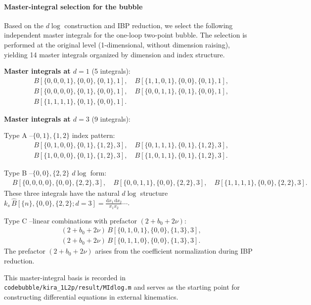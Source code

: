 \documentclass[a4paper,12pt]{article}
\def\di{{\mathrm{d}}}
\begin{document}
\paragraph{Master-integral selection for the bubble}
Based on the $d\log$ construction and IBP reduction, we select the following independent master integrals for the one-loop two-point bubble. The selection is performed at the original level (1-dimensional, without dimension raising), yielding 14 master integrals organized by dimension and index structure.

\textbf{Master integrals at $d=1$} (5 integrals):
\begin{align}
	& B[\{0, 0, 0, 1\}, \{0, 0\}, \{0, 1\}, 1], \quad
	B[\{1, 1, 0, 1\}, \{0, 0\}, \{0, 1\}, 1], \nonumber\\
	& B[\{0, 0, 0, 0\}, \{0, 1\}, \{0, 0\}, 1], \quad
	B[\{0, 0, 1, 1\}, \{0, 1\}, \{0, 0\}, 1], \nonumber\\
	& B[\{1, 1, 1, 1\}, \{0, 1\}, \{0, 0\}, 1].
\end{align}

\textbf{Master integrals at $d=3$} (9 integrals):

Type A --$\{0,1\}, \{1,2\}$ index pattern:
\begin{align}
	& B[\{0, 1, 0, 0\}, \{0, 1\}, \{1, 2\}, 3], \quad
	B[\{0, 1, 1, 1\}, \{0, 1\}, \{1, 2\}, 3], \nonumber\\
	& B[\{1, 0, 0, 0\}, \{0, 1\}, \{1, 2\}, 3], \quad
	B[\{1, 0, 1, 1\}, \{0, 1\}, \{1, 2\}, 3].
\end{align}

Type B --$\{0,0\}, \{2,2\}$ $d\log$ form:
\begin{align}
	& B[\{0, 0, 0, 0\}, \{0, 0\}, \{2, 2\}, 3], \quad
	B[\{0, 0, 1, 1\}, \{0, 0\}, \{2, 2\}, 3], \quad
	B[\{1, 1, 1, 1\}, \{0, 0\}, \{2, 2\}, 3].
\end{align}
These three integrals have the natural $d\log$ structure $k_s\,\hat{B}[\{n\},\{0,0\},\{2,2\};d=3] = \frac{\di x_1\,\di x_2}{x_1 x_2} \cdots$.

Type C --linear combinations with prefactor $(2+b_0+2\nu)$:
\begin{align}
	& (2 + b_0 + 2\nu)\,B[\{0, 1, 0, 1\}, \{0, 0\}, \{1, 3\}, 3], \nonumber\\
	& (2 + b_0 + 2\nu)\,B[\{0, 1, 1, 0\}, \{0, 0\}, \{1, 3\}, 3].
\end{align}
The prefactor $(2+b_0+2\nu)$ arises from the coefficient normalization during IBP reduction.

This master-integral basis is recorded in \texttt{codebubble/kira\_1L2p/result/MIdlog.m} and serves as the starting point for constructing differential equations in external kinematics.
\end{document}

